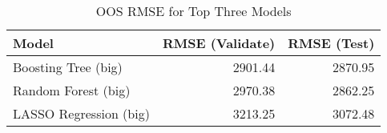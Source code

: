 \begin{table}[ht]
\centering
\caption{OOS RMSE for Top Three Models} 
\label{tab:rmse_test}
\begin{tabular}{lrr}
  \hline
Model & RMSE (Validate) & RMSE (Test) \\ 
  \hline
Boosting Tree (big) & 2901.44 & 2870.95 \\ 
  Random Forest (big) & 2970.38 & 2862.25 \\ 
  LASSO Regression (big) & 3213.25 & 3072.48 \\ 
   \hline
\end{tabular}
\end{table}
